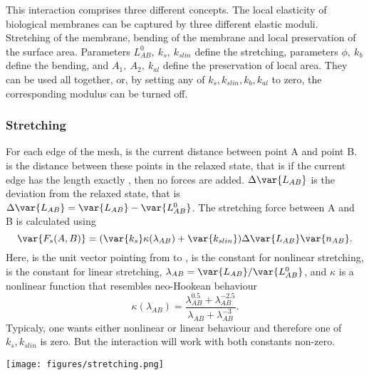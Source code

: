 This interaction comprises three different concepts. The local elasticity of biological membranes can be captured by three different elastic moduli. Stretching of the membrane, bending of the membrane and local preservation of the surface area. Parameters ${L^0_{AB}},\ {k_s},\ {k_{slin}}$ define the stretching, parameters $\phi,\ k_b$ define the bending, and $A_1,\ A_2,\ k_{al}$ define the preservation of local area. They can be used all together, or, by setting any of $k_s, k_{slin}, k_b, k_{al}$ to zero, the corresponding modulus can be turned off.

\subsubsection*{Stretching} For each edge of the mesh,  is the current distance between point A 
and point B.  is the distance between these points in the relaxed 
state, that is if the current edge has the length exactly , then 
no forces are added. $\Delta \var{L_{AB}}$ is the deviation from the relaxed 
state, that is $\Delta \var{L_{AB}} = \var{L_{AB}} - \var{L_{AB}^0}$. The 
stretching force between A and B is calculated using 
\begin{equation}
\var{F_s(A,B)} = (\var{k_s}\kappa(\lambda_{AB}) + \var{k_{slin}})\Delta \var{L_{AB}}\var{n_{AB}}.
\end{equation}
Here,  is the unit vector pointing from  to ,  
is the constant for nonlinear stretching,  
is the constant for linear stretching, $\lambda_{AB} = \var{L_{AB}}/\var{L_{AB}^0}$, and 
$\kappa$ is a nonlinear function that resembles neo-Hookean behaviour
\begin{equation}
\kappa(\lambda_{AB}) = \frac{\lambda_{AB}^{0.5} + \lambda_{AB}^{-2.5}}
{\lambda_{AB} + \lambda_{AB}^{-3}}.
\end{equation}
Typicaly, one wants either nonlinear or linear behaviour and therefore one of $k_s, k_{slin}$ is zero. But the interaction will work with both constants non-zero. 
\begin{center}
  \texttt{[image: figures/stretching.png]}
\end{center}


